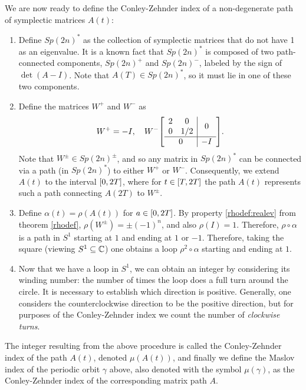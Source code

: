 We are now ready to define the Conley-Zehnder index of a non-degenerate path of symplectic matrices $A(t)$:
\begin{algorithm}
\begin{enumerate}[algorithm]
\item Define $Sp(2n)^*$ as the collection of symplectic matrices that do not have 1 as an eigenvalue. It is a known fact \cite[proposition~7.1.4]{audin} that $Sp(2n)^*$ is composed of two path-connected components, $Sp(2n)^+$ and $Sp(2n)^-$, labeled by the sign of $\det(A-I)$. Note that $A(T) \in Sp(2n)^*$, so it must lie in one of these two components.
\item\label{maslov:step2} Define the matrices $W^+$ and $W^-$ as
\begin{equation}
W^+ = - I, \quad W^- \mleft[\begin{array}{c|c}
\begin{matrix} 2 & 0 \\ 0 & 1/2 \end{matrix} & 0\\
\hline
0 & -I
\end{array}\mright].
\end{equation}
Note that $W^\pm \in Sp(2n)^\pm$, and so any matrix in $Sp(2n)^*$ can be connected via a path (in $Sp(2n)^*$) to either $W^+$ or $W^-$. Consequently, we extend $A(t)$ to the interval $\interval 0 {2T}$, where for $t \in \interval T {2T}$ the path $A(t)$ represents such a path connecting $A(2T)$ to $W^\pm$.
\item Define $\alpha(t) = \rho(A(t))$ for $a \in \interval 0 {2T}$. By property \ref{rhodef:realev} from theorem \ref{rhodef}, $\rho(W^\pm) = \pm(-1)^n$, and also $\rho(I) = 1$. Therefore, $\rho \circ \alpha$ is a path in $S^1$ starting at $1$ and ending at $1$ or $-1$. Therefore, taking the square (viewing $S^1 \subseteq \mathbb{C}$) one obtains a loop $\rho^2 \circ \alpha$ starting and ending at $1$.
\item Now that we have a loop in $S^1$, we can obtain an integer by considering its winding number: the number of times the loop does a full turn around the circle. It is necessary to establish which direction is positive. Generally, one considers the counterclockwise direction to be the positive direction, but for purposes of the Conley-Zehnder index we count the number of \emph{clockwise turns}.
\end{enumerate}
\end{algorithm}
The integer resulting from the above procedure is called the Conley-Zehnder index of the path $A(t)$, denoted $\mu(A(t))$, and finally we define the Maslov index of the periodic orbit $\gamma$ above, also denoted with the symbol $\mu(\gamma)$, as the Conley-Zehnder index of the corresponding matrix path $A$.

